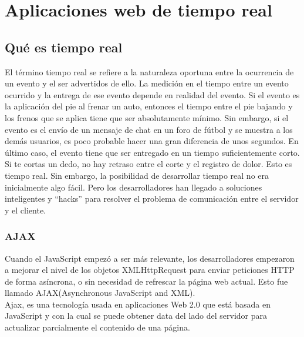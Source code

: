 \section{Aplicaciones web de tiempo real}
\subsection{Qué es tiempo real}
El término tiempo real se refiere a la naturaleza oportuna entre la ocurrencia de un evento y el ser advertidos de ello. La medición en el tiempo entre un evento ocurrido y la entrega de ese evento depende en realidad del evento. Si el evento es la aplicación del pie al frenar un auto, entonces el tiempo entre el pie bajando y los frenos que se aplica tiene que ser absolutamente mínimo. Sin embargo, si el evento es el envío de un mensaje de chat en un foro de fútbol y se muestra a los demás usuarios, es poco probable hacer una gran diferencia de unos segundos. En último caso, el evento tiene que ser entregado en un tiempo suficientemente corto. Si te cortas un dedo, no hay retraso entre el corte y el registro de dolor. Esto es tiempo real. Sin embargo, la posibilidad de desarrollar tiempo real no era inicialmente algo fácil. Pero los desarrolladores han llegado a soluciones inteligentes y ``hacks'' para resolver el problema de comunicación entre el servidor y el cliente.

\subsubsection{AJAX}
Cuando el JavaScript empezó a ser más relevante, los desarrolladores empezaron a mejorar el nivel de los objetos XMLHttpRequest para enviar peticiones HTTP de forma asíncrona, o sin necesidad de refrescar la página web actual. Esto fue llamado AJAX(Asynchronous JavaScript and XML).\\

Ajax, es una tecnología usada en aplicaciones Web 2.0 que está basada en JavaScript y con la cual se puede obtener data del lado del servidor para actualizar parcialmente el contenido de una página\cite{wang_design_2014}.

